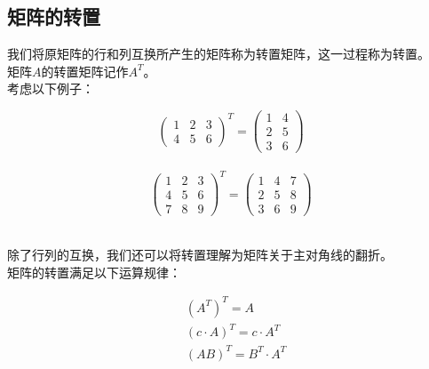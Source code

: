 \documentclass[UTF8]{ctexart}
\begin{document}
\newpage

\subsection{矩阵的转置}
    我们将原矩阵的行和列互换所产生的矩阵称为转置矩阵，这一过程称为转置。\\[3mm]
    矩阵$A$的转置矩阵记作$A^T$。\\[6mm]
    考虑以下例子：
    \begin{large}
        \begin{equation*}
            \begin{pmatrix}
                1&2&3\\
                4&5&6
            \end{pmatrix}^T=
            \begin{pmatrix}
                1&4\\
                2&5\\
                3&6
            \end{pmatrix}
        \end{equation*}\\
        \begin{equation*}
            \begin{pmatrix}
                1&2&3\\
                4&5&6\\
                7&8&9
            \end{pmatrix}^T=
            \begin{pmatrix}
                1&4&7\\
                2&5&8\\
                3&6&9
            \end{pmatrix}
        \end{equation*}
    \end{large}\\[3mm]
    除了行列的互换，我们还可以将转置理解为矩阵关于主对角线的翻折。\\[6mm]
    矩阵的转置满足以下运算规律：
    \begin{large}
        \begin{align*}
            &(A^T)^T=A\\[4mm]
            &(c\cdot A)^T=c\cdot A^T\\[4mm]
            &(AB)^T=B^T\cdot A^T\\[4mm]
        \end{align*}
    \end{large}
\end{document}
